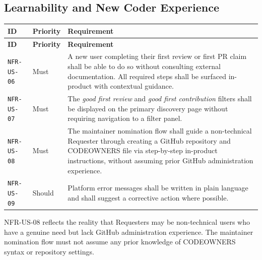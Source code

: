 \documentclass[12pt,a4paper]{article}
\begin{document}
\subsection{Learnability and New Coder Experience}
\begin{longtable}{L{2.2cm} L{1.8cm} L{9.3cm}}
  \color{white}\bfseries ID & \color{white}\bfseries Priority & \color{white}\bfseries Requirement \\
  \endfirsthead
  \color{white}\bfseries ID & \color{white}\bfseries Priority & \color{white}\bfseries Requirement \\
  \endhead\hline
  \texttt{NFR-US-06} & Must   & A new user completing their first review or first PR claim shall be able to do so without consulting external documentation. All required steps shall be surfaced in-product with contextual guidance. \\
  \texttt{NFR-US-07} & Must   & The \emph{good first review} and \emph{good first contribution} filters shall be displayed on the primary discovery page without requiring navigation to a filter panel. \\
  \texttt{NFR-US-08} & Must   & The maintainer nomination flow shall guide a non-technical Requester through creating a GitHub repository and CODEOWNERS file via step-by-step in-product instructions, without assuming prior GitHub administration experience. \\
  \texttt{NFR-US-09} & Should & Platform error messages shall be written in plain language and shall suggest a corrective action where possible. \\
  \hline
\end{longtable}

\begin{infobox}
NFR-US-08 reflects the reality that Requesters may be non-technical users who have a genuine need but lack GitHub administration experience. The maintainer nomination flow must not assume any prior knowledge of CODEOWNERS syntax or repository settings.
\end{infobox}
\end{document}
